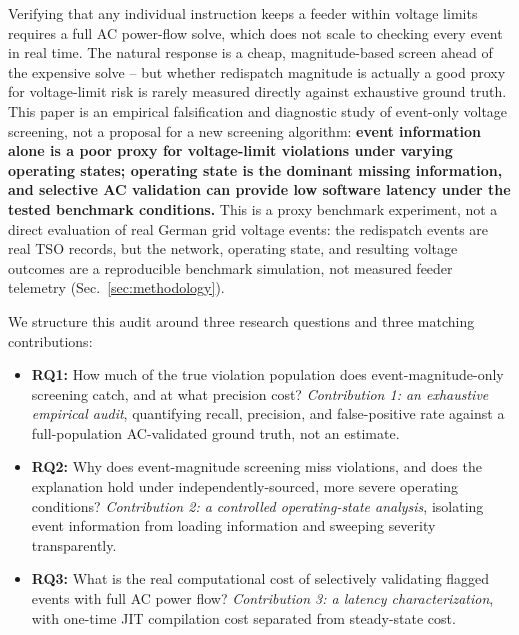 \documentclass[11pt,conference]{IEEEtran}
\begin{document}
Verifying that any individual instruction keeps a feeder within voltage limits requires a full AC
power-flow solve, which does not scale to checking every event in real time. The natural response is
a cheap, magnitude-based screen ahead of the expensive solve -- but whether redispatch magnitude is
actually a good proxy for voltage-limit risk is rarely measured directly against exhaustive ground
truth. This paper is an empirical falsification and diagnostic study of event-only voltage
screening, not a proposal for a new screening algorithm: \textbf{event information alone is a poor
proxy for voltage-limit violations under varying operating states; operating state is the dominant
missing information, and selective AC validation can provide low software latency under the tested
benchmark conditions.} This is a proxy benchmark experiment, not a direct evaluation of real German
grid voltage events: the redispatch events are real TSO records, but the network, operating state,
and resulting voltage outcomes are a reproducible benchmark simulation, not measured feeder
telemetry (Sec.~\ref{sec:methodology}).

We structure this audit around three research questions and three matching contributions:
\begin{itemize}
    \item \textbf{RQ1:} How much of the true violation population does event-magnitude-only screening catch, and at what precision cost? \textit{Contribution 1: an exhaustive empirical audit}, quantifying recall, precision, and false-positive rate against a full-population AC-validated ground truth, not an estimate.
    \item \textbf{RQ2:} Why does event-magnitude screening miss violations, and does the explanation hold under independently-sourced, more severe operating conditions? \textit{Contribution 2: a controlled operating-state analysis}, isolating event information from loading information and sweeping severity transparently.
    \item \textbf{RQ3:} What is the real computational cost of selectively validating flagged events with full AC power flow? \textit{Contribution 3: a latency characterization}, with one-time JIT compilation cost separated from steady-state cost.
\end{itemize}

\end{document}
